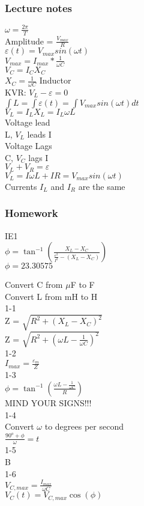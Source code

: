 \documentclass{article}
\begin{document}
\subsubsection{Lecture notes}
\noindent
$\omega = \frac{2 \pi}{T}$ \\
Amplitude = $ \frac{V_{max}}{R}$ \\
$\varepsilon(t) = V_{max} sin(\omega t)$  \\
$V_{max} = I_{max} * \frac{1}{\omega C} $ \\
$V_C = I_C X_C$ \\
$X_C = \frac{1}{\omega C} $
Inductor \\
KVR: $V_L - \varepsilon = 0$ \\
$\int L = \int \varepsilon(t) = \int V_{max} sin(\omega t) dt$ \\
$V_L = I_L X_L = I_L \omega L$ \\
Voltage lead \\
L, $V_L$ leads I \\
Voltage Lags \\
C, $V_C$ lags I \\
$V_L + V_R = \varepsilon$ \\
$V_L = I \omega L + IR = V_{max} sin(\omega t)$ \\
Currents $I_L$ and $I_R$ are the same

\subsubsection{Homework}

\noindent
IE1 \\
$\phi = \tan^{-1} (\frac{X_L - X_C }{\frac{\varepsilon^2}{I^2} - (X_L -X_C)})$ \\
$\phi = 23.30575$

\vspace{2mm}

\noindent
Convert C from $\mu$F to F \\
Convert L from mH to H \\
1-1 \\
Z = $\sqrt{R^2 + (X_L - X_C)^2}$ \\
Z = $\sqrt{R^2 + (\omega L - \frac{1}{\omega C})^2}$ \\
1-2 \\
$I_{max} = \frac{\varepsilon_m}{Z}$ \\
1-3 \\
$\phi = \tan^{-1}(\frac{\omega L - \frac{1}{\omega C}}{R})$ \\
MIND YOUR SIGNS!!! \\
1-4 \\
Convert $\omega$ to degrees per second \\
$\frac{90^o + \phi}{\omega} = t$ \\
1-5 \\
B \\
1-6 \\
$V_{C,max} = \frac{I_{max}}{\omega C}$ \\
$V_C(t) = V_{C,max} \cos(\phi)$
\end{document}
